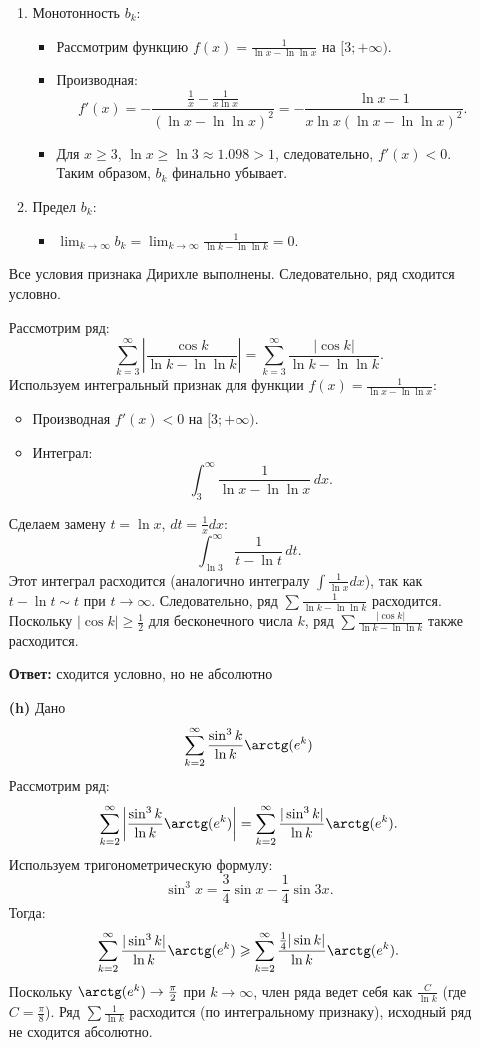 \documentclass[a4paper]{article}
\renewcommand{\geq}{\geqslant}
\begin{document}
\begin{enumerate}
\begin{enumerate}
\item Монотонность \( b_k \):
  \begin{itemize}
  \item Рассмотрим функцию \( f(x) = \frac{1}{\ln x - \ln \ln x} \) на \( [3; +\infty) \).
  \item Производная:
    \[
    f'(x) = -\frac{\frac{1}{x} - \frac{1}{x \ln x}}{(\ln x - \ln \ln x)^2} = -\frac{\ln x - 1}{x \ln x (\ln x - \ln \ln x)^2}.
    \]
  \item Для \( x \geq 3 \), \( \ln x \geq \ln 3 \approx 1.098 > 1 \), следовательно, \( f'(x) < 0 \). Таким образом, \( b_k \) финально убывает.
  \end{itemize}

\item Предел \( b_k \):
  \begin{itemize}
  \item \( \lim_{k \to \infty} b_k = \lim_{k \to \infty} \frac{1}{\ln k - \ln \ln k} = 0 \).
  \end{itemize}
\end{enumerate}

Все условия признака Дирихле выполнены. Следовательно, ряд сходится условно.

Рассмотрим ряд:
\[
\sum_{k=3}^{\infty} \left| \frac{\cos k}{\ln k - \ln \ln k} \right| = \sum_{k=3}^{\infty} \frac{|\cos k|}{\ln k - \ln \ln k}.
\]
Используем интегральный признак для функции \( f(x) = \frac{1}{\ln x - \ln \ln x} \):
\begin{itemize}
\item Производная \( f'(x) < 0 \) на \( [3; +\infty) \).
\item Интеграл:
  \[
  \int_{3}^{\infty} \frac{1}{\ln x - \ln \ln x} \, dx.
  \]
\end{itemize}
Сделаем замену \( t = \ln x \), \( dt = \frac{1}{x} dx \):
\[
\int_{\ln 3}^{\infty} \frac{1}{t - \ln t} \, dt.
\]
Этот интеграл расходится (аналогично интегралу \( \int \frac{1}{\ln x} dx \)), так как \( t - \ln t \sim t \) при \( t \to \infty \). Следовательно, ряд \( \sum \frac{1}{\ln k - \ln \ln k} \) расходится. Поскольку \( |\cos k| \geq \frac{1}{2} \) для бесконечного числа \( k \), ряд \( \sum \frac{|\cos k|}{\ln k - \ln \ln k} \) также расходится.

\textbf{Ответ: } сходится условно, но не абсолютно\\

\item[\textbf{(h)}]Дано
$$\sum_{k=2}^{\infty} \frac{\sin^3 k}{\ln k} \arctg(e^k) $$
Рассмотрим ряд:
\[
\sum_{k=2}^{\infty} \left| \frac{\sin^3 k}{\ln k} \arctg(e^k) \right| = \sum_{k=2}^{\infty} \frac{|\sin^3 k|}{\ln k} \arctg(e^k).
\]
Используем тригонометрическую формулу:
\[
\sin^3 x = \frac{3}{4} \sin x - \frac{1}{4} \sin 3x.
\]
Тогда:
\[
\sum_{k=2}^{\infty} \frac{|\sin^3 k|}{\ln k} \arctg(e^k) \geq \sum_{k=2}^{\infty} \frac{\frac{1}{4} |\sin k|}{\ln k} \arctg(e^k).
\]
Поскольку \( \arctg(e^k) \to \frac{\pi}{2} \) при \( k \to \infty \), 
член ряда ведет себя как \( \frac{C}{\ln k} \) (где \( C = \frac{\pi}{8} \)). 
Ряд \( \sum \frac{1}{\ln k} \) расходится (по интегральному признаку), 
исходный ряд не сходится абсолютно.


\end{enumerate}
\end{document}
